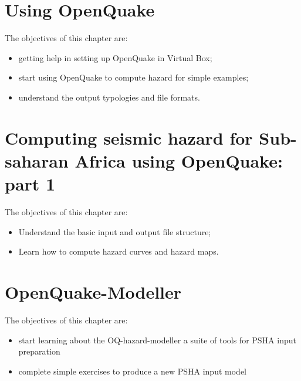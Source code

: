 \documentclass[11pt,a4paper,headings=small,dvips]{scrbook}
\newenvironment{myfancybox}{%
  \def\FrameCommand{\fboxsep=\FrameSep \fcolorbox{blue01}{honeydew}}%
  \color{black}\MakeFramed {\FrameRestore}}%
 {\endMakeFramed}
\begin{document}
\chapter{Using OpenQuake}
\begin{myfancybox}
The objectives of this chapter are:
\begin{itemize}
    \item getting help in setting up OpenQuake in Virtual Box;
    \item start using OpenQuake to compute hazard for simple examples;
    \item understand the output typologies and file formats.
\end{itemize}
\end{myfancybox}
    
    \clearpage
    
\chapter{Computing seismic hazard for Sub-saharan Africa using OpenQuake: part 1}
\begin{myfancybox}
The objectives of this chapter are:
\begin{itemize}
    \item Understand the basic input and output file structure;
    \item Learn how to compute hazard curves and hazard maps.
\end{itemize}
\end{myfancybox}
    
\cleardoublepage
\chapter{OpenQuake-Modeller}
\begin{myfancybox}
The objectives of this chapter are:
\begin{itemize}
    \item start learning about the OQ-hazard-modeller a suite of tools for 
        PSHA input preparation
    \item complete simple exercises to produce a new PSHA input model 
\end{itemize}
\end{myfancybox}
  
\cleardoublepage
\end{document}
